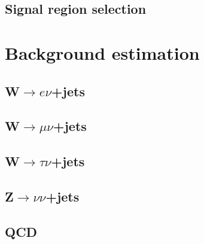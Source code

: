 
\subsection{Signal region selection}%
\label{sec:parkedsigsel}


\section{Background estimation}%
\label{sec:parkedbkg}

\subsection{W$\rightarrow e\nu$+jets}%
\label{sec:parkedwenu}

\subsection{W$\rightarrow \mu\nu$+jets}%
\label{sec:parkedwmunu}

\subsection{W$\rightarrow \tau\nu$+jets}%
\label{sec:parkedwtaunu}

\subsection{Z$\rightarrow \nu\nu$+jets}%
\label{sec:parkedznunu}

\subsection{QCD}%
\label{sec:parkedQCD}

